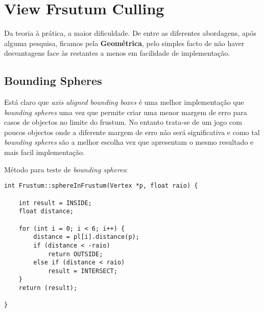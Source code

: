 \chapter{View Frsutum Culling}

Da teoria à prática, a maior dificuldade. De entre as diferentes abordagens, após alguma pesquisa, ficamos pela {\bf Geométrica}, pelo simples facto de não haver desvantagens face às restantes a menos em facilidade de implementação.

\section{Bounding Spheres}
Está claro que \textit{axis aligned bounding boxes} é uma melhor implementação que \textit{bounding spheres} uma vez que permite criar uma menor margem de erro para casos de objectos no limite do frustum. No entanto trata-se de um jogo com poucos objectos onde a diferente margem de erro não será significativa e como tal \textit{bounding spheres} são a melhor escolha vez que apresentam o mesmo resultado e mais facil implementação.

Método para teste de \textit{bounding spheres}:
\begin{lstlisting}
int Frustum::sphereInFrustum(Vertex *p, float raio) {

    int result = INSIDE;
    float distance;

    for (int i = 0; i < 6; i++) {
        distance = pl[i].distance(p);
        if (distance < -raio)
            return OUTSIDE;
        else if (distance < raio)
            result = INTERSECT;
    }
    return (result);

}
\end{lstlisting}